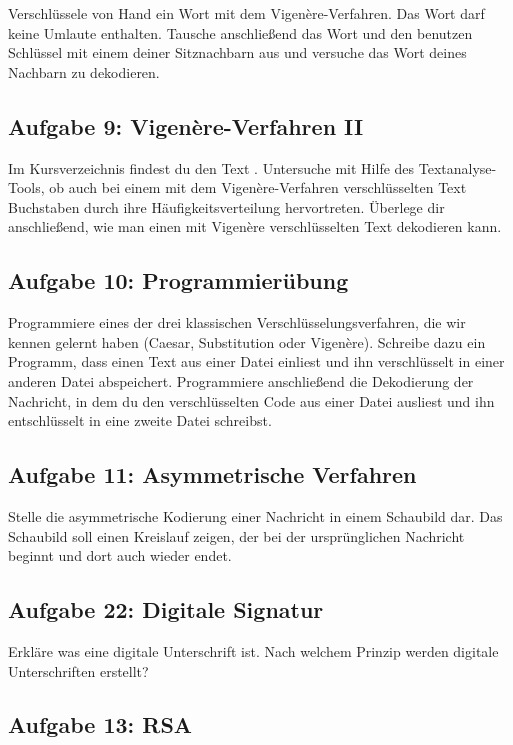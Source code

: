 Verschlüssele von Hand ein Wort mit dem Vigenère-Verfahren. Das Wort darf keine
Umlaute enthalten. Tausche anschließend das Wort und den benutzen Schlüssel mit
einem deiner Sitznachbarn aus und versuche das Wort deines Nachbarn zu
dekodieren.


\subsection{Aufgabe 9: Vigenère-Verfahren II}

Im Kursverzeichnis findest du den Text . Untersuche
mit Hilfe des Textanalyse-Tools, ob auch bei einem mit dem Vigenère-Verfahren
verschlüsselten Text Buchstaben durch ihre Häufigkeitsverteilung hervortreten.
Überlege dir anschließend, wie man einen mit Vigenère verschlüsselten Text
dekodieren kann.


\subsection{Aufgabe 10: Programmierübung}

Programmiere eines der drei klassischen Verschlüsselungsverfahren, die wir
kennen gelernt haben (Caesar, Substitution oder Vigenère). Schreibe dazu ein
Programm, dass einen Text aus einer Datei einliest und ihn verschlüsselt in
einer anderen Datei abspeichert. Programmiere anschließend die Dekodierung der
Nachricht, in dem du den verschlüsselten Code aus einer Datei ausliest und ihn
entschlüsselt in eine zweite Datei schreibst.


\subsection{Aufgabe 11: Asymmetrische Verfahren}

Stelle die asymmetrische Kodierung einer Nachricht in einem Schaubild dar. Das
Schaubild soll einen Kreislauf zeigen, der bei der ursprünglichen Nachricht
beginnt und dort auch wieder endet.


\subsection{Aufgabe 22: Digitale Signatur}

Erkläre was eine digitale Unterschrift ist. Nach welchem Prinzip werden
digitale Unterschriften erstellt?


\subsection{Aufgabe 13: RSA}

